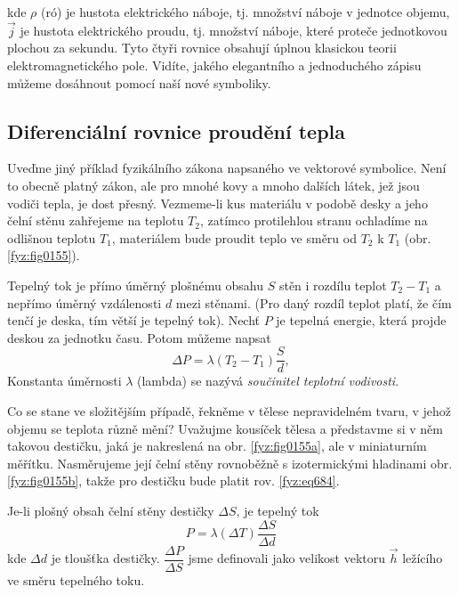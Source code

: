         kde $\rho$ (ró) je hustota elektrického náboje, tj. množství náboje v jednotce objemu,
        $\vec{j}$ je hustota elektrického proudu, tj. množství náboje, které proteče jednotkovou
        plochou za sekundu. Tyto čtyři rovnice obsahují úplnou klasickou teorii elektromagnetického
        pole. Vidíte, jakého elegantního a jednoduchého zápisu můžeme dosáhnout pomocí naší nové
        symboliky.
        
    \subsection{Diferenciální rovnice proudění tepla}\label{fyz:IIchapIIsecVI}
      Uveďme jiný příklad fyzikálního zákona napsaného ve vektorové symbolice. Není to obecně platný 
      zákon, ale pro mnohé kovy a mnoho dalších látek, jež jsou vodiči tepla, je dost přesný. 
      Vezmeme-li kus materiálu v podobě desky a jeho čelní stěnu zahřejeme na teplotu $T_2$, zatímco 
      protilehlou stranu ochladíme na odlišnou teplotu $T_1$, materiálem bude proudit teplo ve směru 
      od $T_2$ k $T_1$ (obr. \ref{fyz:fig0155}).
      
      Tepelný tok je přímo úměrný plošnému obsahu $S$ stěn i rozdílu teplot $T_2-T_1$ a nepřímo 
      úměrný vzdálenosti $d$ mezi stěnami. (Pro daný rozdíl teplot platí, že čím tenčí je deska, tím 
      větší je tepelný tok). Nechť $P$ je tepelná energie, která projde deskou za jednotku času. 
      Potom můžeme napsat
      \begin{equation}\label{fyz:eq684}
        \Delta P=\lambda(T_2-T_1)\frac{S}{d},
      \end{equation}
      Konstanta úměrnosti $\lambda$ (lambda) se nazývá \emph{součinitel teplotní vodivosti}.
      
      Co se stane ve složitějším případě, řekněme v tělese nepravidelném tvaru, v jehož objemu se 
      teplota různě mění? Uvažujme kousíček tělesa a představme si v něm takovou destičku, jaká je 
      nakreslená na obr. \ref{fyz:fig0155a}, ale v miniaturním měřítku. Nasměrujeme její čelní 
      stěny rovnoběžně s izotermickými hladinami obr. \ref{fyz:fig0155b}, takže pro destičku bude 
      platit rov. \ref{fyz:eq684}.
      
      Je-li plošný obsah čelní stěny destičky $\Delta S$, je tepelný tok
      \begin{equation}\label{fyz:eq683}
        P=\lambda(\Delta T)\frac{\Delta S}{\Delta d}
      \end{equation}
      kde $\Delta d$ je tloušťka destičky. $\dfrac{\Delta P}{\Delta S}$ jsme definovali jako velikost
      vektoru $\vec{h}$ ležícího ve směru tepelného toku. 
  
